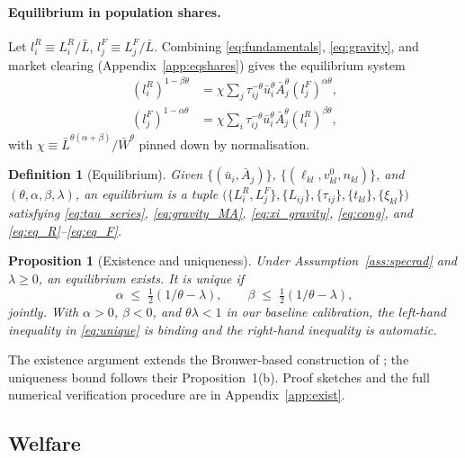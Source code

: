 \documentclass[12pt]{article}
\newtheorem{proposition}{Proposition}
\newtheorem{definition}{Definition}
\newcommand{\Lbar}{\bar L}
\newcommand{\Wbar}{\bar W}
\newcommand{\ubar}{\bar u}
\newcommand{\Abar}{\bar A}
\newcommand{\tkl}{t_{kl}}
\newcommand{\tijk}{\tau_{ij}}
\begin{document}
\paragraph{Equilibrium in population shares.}
Let $l_i^R\equiv L_i^R/\Lbar$, $l_j^F\equiv L_j^F/\Lbar$.  Combining
\eqref{eq:fundamentals}, \eqref{eq:gravity}, and market clearing
(Appendix~\ref{app:eqshares}) gives the equilibrium system
\begin{align}
  (l_i^R)^{1-\beta\theta}
  &=\chi\sum_{j}\tijk^{-\theta}\ubar_i^{\theta}\Abar_j^{\theta}(l_j^F)^{\alpha\theta},
  \label{eq:eq_R}\\
  (l_j^F)^{1-\alpha\theta}
  &=\chi\sum_{i}\tijk^{-\theta}\ubar_i^{\theta}\Abar_j^{\theta}(l_i^R)^{\beta\theta},
  \label{eq:eq_F}
\end{align}
with $\chi\equiv\Lbar^{\theta(\alpha+\beta)}/\Wbar^{\theta}$ pinned
down by normalisation.

\begin{definition}[Equilibrium]\label{def:eq}
Given $\{(\ubar_i,\Abar_j)\}$, $\{(\ell_{kl},v^{0}_{kl},n_{kl})\}$,
and $(\theta,\alpha,\beta,\lambda)$, an equilibrium is a tuple
$\bigl(\{L_i^R,L_j^F\},\{L_{ij}\},\{\tijk\},\{\tkl\},\{\xi_{kl}\}\bigr)$
satisfying \eqref{eq:tau_series}, \eqref{eq:gravity_MA},
\eqref{eq:xi_gravity}, \eqref{eq:cong}, and
\eqref{eq:eq_R}--\eqref{eq:eq_F}.
\end{definition}

\begin{proposition}[Existence and uniqueness]\label{prop:exist}
Under Assumption~\ref{ass:specrad} and $\lambda\ge 0$, an equilibrium
exists.  It is unique if
\begin{equation}
  \alpha\;\le\;\tfrac{1}{2}(1/\theta-\lambda),
  \qquad
  \beta\;\le\;\tfrac{1}{2}(1/\theta-\lambda),
  \label{eq:unique}
\end{equation}
jointly.  With $\alpha>0$, $\beta<0$, and $\theta\lambda<1$ in our
baseline calibration, the left-hand inequality in \eqref{eq:unique}
is binding and the right-hand inequality is automatic.
\end{proposition}

The existence argument extends the Brouwer-based construction of
\citet{AllenArkolakis2022}; the uniqueness bound follows their
Proposition~1(b).  Proof sketches and the full numerical verification
procedure are in Appendix~\ref{app:exist}.

\subsection{Welfare}\label{ssec:welfare}
\end{document}
